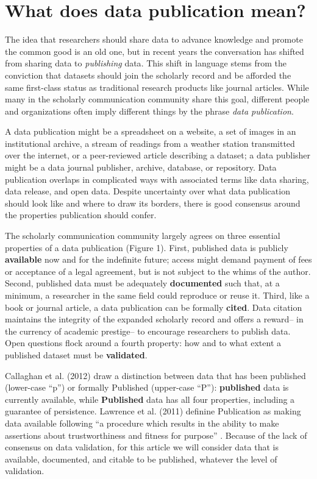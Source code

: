\documentclass[10pt,a4paper,twocolumn]{article}
\begin{document}
\section*{What does data publication mean?}\label{introduction}

The idea that researchers should share data to advance knowledge and promote the common good is an old one, but in recent years the conversation has shifted from sharing data to \emph{publishing} data\cite{costello_motivating_2009,smith_data_2009,lawrence_data_2011}.
This shift in language stems from the conviction that datasets should join the scholarly record and be afforded the same first-class status as traditional research products like journal articles\cite{reilly_report_2011, sarah_callaghan_making_2012}.
While many in the scholarly communication community share this goal, different people and organizations often imply different things by the phrase \emph{data publication}.

A data publication might be a spreadsheet on a website, a set of images in an institutional archive, a stream of readings from a weather station transmitted over the internet, or a peer-reviewed article describing a dataset; a data publisher might be a data journal publisher, archive, database, or repository.
Data publication overlaps in complicated ways with associated terms like data sharing, data release, and open data.
Despite uncertainty over what data publication should look like and where to draw its borders, there is good consensus around the properties publication should confer.

The scholarly communication community largely agrees on three essential properties of a data publication (Figure 1)\cite{smith_data_2009,sarah_callaghan_making_2012}.
First, published data is publicly \textbf{available} now and for the indefinite future; access might demand payment of fees or acceptance of a legal agreement, but is not subject to the whims of the author.
Second, published data must be adequately \textbf{documented} such that, at a minimum, a researcher in the same field could reproduce or reuse it.
Third, like a book or journal article, a data publication can be formally \textbf{cited}.
Data citation maintains the integrity of the expanded scholarly record and offers a reward-- in the currency of academic prestige-- to encourage researchers to publish data. 
Open questions flock around a fourth property: how and to what extent a published dataset must be \textbf{validated}.

Callaghan et al. (2012) draw a distinction between data that has been published (lower-case “p”) or formally Published (upper-case “P”): \textbf{published} data is currently available, while \textbf{Published} data has all four properties, including a guarantee of persistence\cite{sarah_callaghan_making_2012}.
Lawrence et al. (2011) definine Publication as making data available following ``a procedure which results in the ability to make assertions about trustworthiness and fitness for purpose'' \cite{lawrence_data_2011}.
Because of the lack of consensus on data validation, for this article we will consider data that is available, documented, and citable to be published,
whatever the level of validation.
\end{document}
